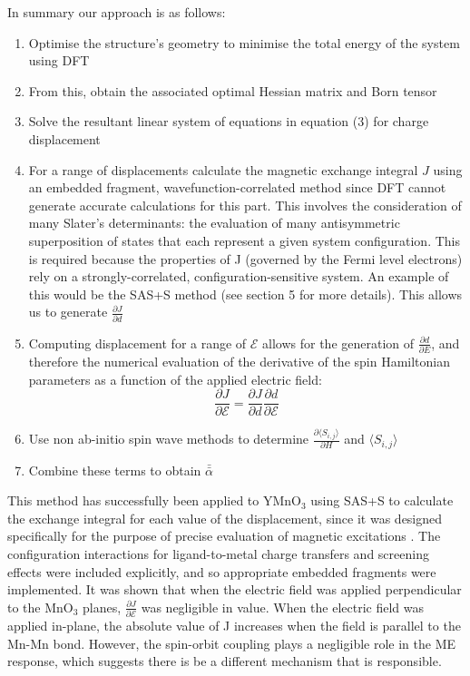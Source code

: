 \documentclass[10pt]{article}
\begin{document}
In summary our approach is as follows:

\begin{enumerate}
	\item Optimise the structure's geometry to minimise the total energy of the system using DFT
	\item From this, obtain the associated optimal Hessian matrix and Born tensor
	\item Solve the resultant linear system of equations in equation (3) for charge displacement
	\item For a range of displacements calculate the magnetic exchange integral $J$ using an embedded fragment, wavefunction-correlated method since DFT cannot generate accurate calculations for this part. This involves the consideration of many Slater's determinants: the evaluation of many antisymmetric superposition of states that each represent a given system configuration. This is required because the properties of J (governed by the Fermi level electrons) rely on a strongly-correlated, configuration-sensitive system. An example of this would be the SAS+S method (see section 5 for more details). This allows us to generate $\frac{\partial J}{\partial d}$
	\item Computing displacement for a range of $\mathcal{E}$ allows for the generation of $\frac{\partial d}{\partial E}$, and therefore the numerical evaluation of the derivative of the spin Hamiltonian parameters as a function of the applied electric field:
	\begin{equation*}
	\dfrac{\partial J}{\partial \mathcal{E}} = \dfrac{\partial J}{\partial d}\dfrac{\partial d}{\partial \mathcal{E}}
	\end{equation*}
	\item Use non ab-initio spin wave methods to determine $\frac{\partial\langle S_{i,j}\rangle}{\partial H}$ and $\langle S_{i,j}\rangle$
	\item Combine these terms to obtain $\bar{\bar{\alpha}}$
\end{enumerate}

This method has successfully been applied to YMnO$_3$ using SAS+S to calculate the exchange integral for each value of the displacement, since it was designed specifically for the purpose of precise evaluation of magnetic excitations \cite{varignon2013ab}. The configuration interactions for ligand-to-metal charge transfers and screening effects were included explicitly, and so appropriate embedded fragments were implemented. It was shown that when the electric field was applied perpendicular to the MnO$_3$ planes, $\frac{\partial J}{\partial \mathcal{E}}$  was negligible in value. When the electric field was applied in-plane, the absolute value of J increases when the field is parallel to the Mn-Mn bond. However, the spin-orbit coupling plays a negligible role in the ME response, which suggests there is be a different mechanism that is responsible.
\end{document}
